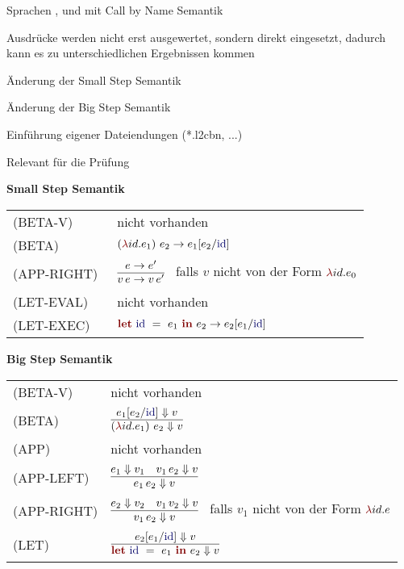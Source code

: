 {
  \begin{itemgroup}{}
    \item Sprachen \LZEROCBN, \LONECBN und \LTWOCBN  mit Call by Name Semantik
    \item Ausdrücke werden nicht erst ausgewertet, sondern direkt eingesetzt,
          dadurch kann es zu unterschiedlichen Ergebnissen kommen
    \item Änderung der Small Step Semantik
    \item Änderung der Big Step Semantik
    \item Einführung eigener Dateiendungen (*.l2cbn, ...)
    \item Relevant für die Prüfung \glqq \TPONE \grqq
  \end{itemgroup}
}


{
  {\bf Small Step Semantik}\\[5mm]
  \begin{tabular}{ll}
     \mbox{(BETA-V)}      & nicht vorhanden \\[3mm]
     \mbox{(BETA)}        & $\ExprApplication{\Parenthesis{\ExprLambda{id}{}{e_1}}}{e_2} \to
                                               e_1[e_2/\ExprIdentifier{id}]$ \\[3mm]
     \mbox{(APP-RIGHT)\ } & $\smallsteprule{e \to e'}
                              {v\,e \to v\,e'}$ \ 
                              falls ${v}$ nicht von der Form $\ExprLambda{id}{}{e_0}$ \\[5mm]
     \mbox{(LET-EVAL)\  } & nicht vorhanden \\[3mm]
     \mbox{(LET-EXEC)}    & $\ExprLet{\ExprIdentifier{id}}{}{e_1}{e_2} \to
                                      e_2[e_1/\ExprIdentifier{id}]$ \\[3mm]
  \end{tabular}
}


{
  {\bf Big Step Semantik}\\[5mm]
  \begin{tabular}{ll}
     \mbox{(BETA-V)}      & nicht vorhanden \\[3mm]
     \mbox{(BETA)}        & $\bigsteprule{e_1[e_2/\ExprIdentifier{id}] \eval v}
                              {\ExprApplication{\Parenthesis{\ExprLambda{id}{}{e_1}}}{e_2} \eval v}$ \\[5mm]
     \mbox{(APP)}         & nicht vorhanden \\[3mm]
     \mbox{(APP-LEFT)}    & $\bigsteprule{e_1 \eval v_1 \quad v_1\,e_2 \eval v}
                              {e_1\,e_2 \eval v}$ \\[5mm]
     \mbox{(APP-RIGHT)}   & $\bigsteprule{e_2 \eval v_2 \quad v_1\,v_2 \eval v}
                              {v_1\,e_2 \eval v}$ \ 
                              falls ${v_1}$ nicht von der Form $\ExprLambda{id}{}{e}$ \\[5mm]
     \mbox{(LET)}         & $\bigsteprule{e_2[e_1/\ExprIdentifier{id}] \eval v}
                              {\ExprLet{\ExprIdentifier{id}}{}{e_1}{e_2} \eval v}$ \\[5mm]
  \end{tabular}
}



